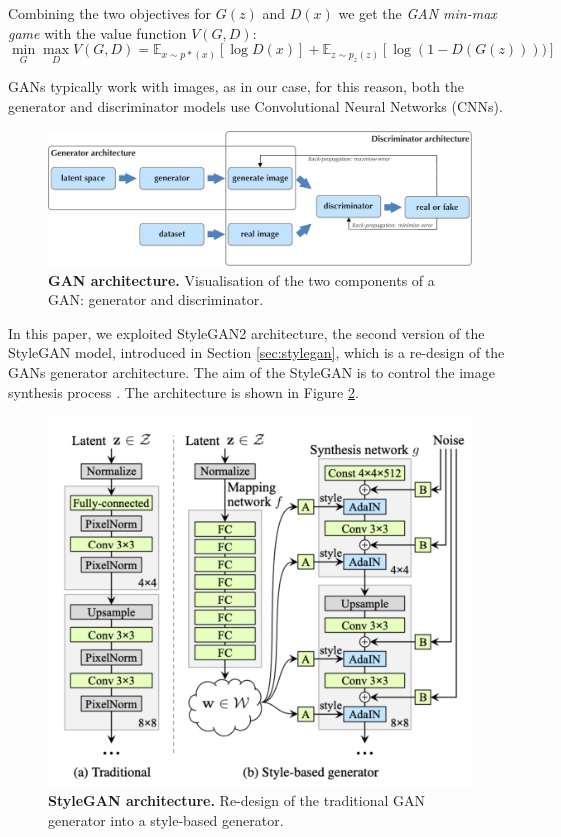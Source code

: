 \documentclass{article}
\begin{document}
	Combining the two objectives for $G(z)$ and $D(x)$ we get the \textit{GAN min-max game} with the 
	value function $V(G,D)$:
	\begin{equation}
		\label{e:minmaxgame}
		\min_G \max_D V(G,D) = 
		\mathbb{E}_{x \sim p*(x)} [\log D(x)] + \mathbb E _{z \sim p_z(z)} [\log (1-D(G(z))))]
	\end{equation}
	
	GANs typically work with images, as in our case, for this reason, both the generator and 
	discriminator models use Convolutional Neural Networks (CNNs).
	\begin{figure}[htb]				
		\centering
		\includegraphics[width=.7\linewidth]{images/GAN}
		\caption{\textbf{GAN architecture.} Visualisation of the two components of a GAN: generator and 
			discriminator.}
		\label{fig:gan}
	\end{figure}
	
	In this paper, we exploited StyleGAN2 architecture, the second version of the StyleGAN model, 
	introduced in Section \ref{sec:stylegan}, which is a re-design of the GANs generator architecture.
	The aim of the StyleGAN is to control the image synthesis process \cite{karras2019style}. The 
	architecture is shown in Figure \ref{fig:styleGAN}.
	\begin{figure}[htb]				
		\centering
		\includegraphics[width=.55\linewidth]{images/styleGAN}
		\caption{\textbf{StyleGAN architecture.} Re-design of the traditional GAN generator into a 
			style-based generator.}
		\label{fig:styleGAN}
	\end{figure}
	
\end{document}
